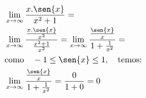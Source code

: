 \begin{ex}
\begin{align}
&\lim_{x\rightarrow \infty} \frac{x.\sen{x}}{x^2+1}=\nonumber\\
&\lim_{x\rightarrow \infty} \frac{\frac{x.\sen{x}}{x^2}}{\frac{x^2+1}{x^2}}=\lim_{x\rightarrow \infty} \frac{\frac{\sen{x}}{x}}{1+\frac{1}{x^2}}=\nonumber\\
&\text{como}\quad -1\leq\sen{x}\leq 1,\quad\text{temos:}\nonumber\\
&\lim_{x\rightarrow \infty} \frac{\frac{\sen{x}}{x}}{1+\frac{1}{x^2}}=\frac{0}{1+0}=0\nonumber
\end{align}
\end{ex}